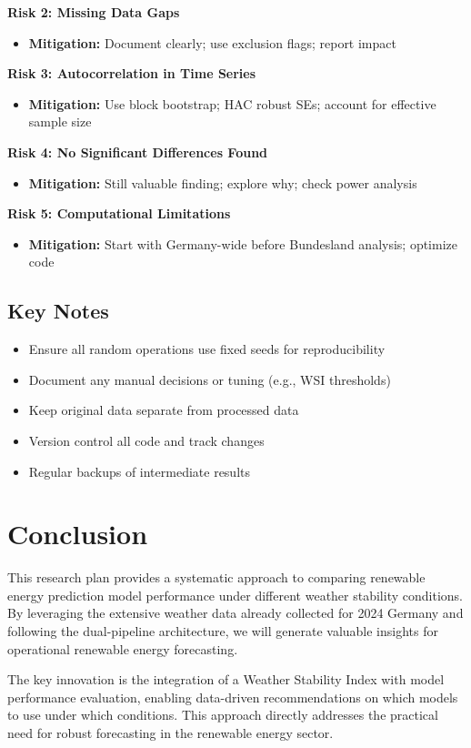 \documentclass[11pt,a4paper]{article}
\begin{document}
\textbf{Risk 2: Missing Data Gaps}
\begin{itemize}
    \item \textbf{Mitigation:} Document clearly; use exclusion flags; report impact
\end{itemize}

\textbf{Risk 3: Autocorrelation in Time Series}
\begin{itemize}
    \item \textbf{Mitigation:} Use block bootstrap; HAC robust SEs; account for effective sample size
\end{itemize}

\textbf{Risk 4: No Significant Differences Found}
\begin{itemize}
    \item \textbf{Mitigation:} Still valuable finding; explore why; check power analysis
\end{itemize}

\textbf{Risk 5: Computational Limitations}
\begin{itemize}
    \item \textbf{Mitigation:} Start with Germany-wide before Bundesland analysis; optimize code
\end{itemize}

\subsection{Key Notes}

\begin{itemize}
    \item Ensure all random operations use fixed seeds for reproducibility
    \item Document any manual decisions or tuning (e.g., WSI thresholds)
    \item Keep original data separate from processed data
    \item Version control all code and track changes
    \item Regular backups of intermediate results
\end{itemize}

\section{Conclusion}

This research plan provides a systematic approach to comparing renewable energy prediction model performance under different weather stability conditions. By leveraging the extensive weather data already collected for 2024 Germany and following the dual-pipeline architecture, we will generate valuable insights for operational renewable energy forecasting.

The key innovation is the integration of a Weather Stability Index with model performance evaluation, enabling data-driven recommendations on which models to use under which conditions. This approach directly addresses the practical need for robust forecasting in the renewable energy sector.
\end{document}

